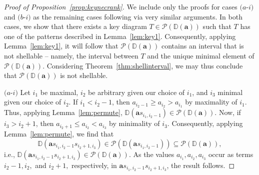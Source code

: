 \documentclass[letterpaper,10pt]{article}
\begin{document}
\begin{proof}[Proof of Proposition~\ref{prop:keynecrank}]
We include only the proofs for cases $(a$-$i)$ and $(b$-$i)$ as the remaining cases following via very similar arguments. In both cases, we show that there exists a key diagram $T\in \mathcal{P}(\mathbb{D}(\mathbf{a}))$ such that $T$ has one of the patterns described in Lemma~\ref{lem:key1}. Consequently, applying Lemma~\ref{lem:key1}, it will follow that $\mathcal{P}(\mathbb{D}(\mathbf{a}))$ contains an interval that is not shellable -- namely, the interval between $T$ and the unique minimal element of $\mathcal{P}(\mathbb{D}(\mathbf{a})).$ Considering Theorem~\ref{thm:shellinterval}, we may thus conclude that $\mathcal{P}(\mathbb{D}(\mathbf{a}))$ is not shellable.
\bigskip

\noindent
$(a$-$i)$ Let $i_1$ be maximal, $i_2$ be arbitrary given our choice of $i_1$, and $i_3$ minimal given our choice of $i_2$. If $i_1<i_2-1$, then $a_{i_2-1}\ge a_{i_2}>a_{i_1}$ by maximality of $i_1$. Thus, applying Lemma~\ref{lem:permute}, $\mathbb{D}(\mathbf{a}s_{i_1,i_2-1})\in \mathcal{P}(\mathbb{D}(\mathbf{a}))$. Now, if $i_3>i_2+1$, then $a_{i_2+1}\le a_{i_2}<a_{i_3}$ by minimality of $i_3$. Consequently, applying Lemma~\ref{lem:permute}, we find that $$\mathbb{D}(\mathbf{a}s_{i_1,i_2-1}s_{i_2+1,i_3})\in \mathcal{P}(\mathbb{D}(\mathbf{a}s_{i_1,i_2-1}))\subseteq \mathcal{P}(\mathbb{D}(\mathbf{a})),$$ i.e., $\mathbb{D}(\mathbf{a}s_{i_1,i_2-1}s_{i_2+1,i_3})\in \mathcal{P}(\mathbb{D}(\mathbf{a}))$. As the values $a_{i_1},a_{i_2},a_{i_3}$ occur as terms $i_2-1, i_2,$ and $i_2+1,$ respectively, in $\mathbf{a}s_{i_1,i_2-1}s_{i_2+1,i_3}$, the result follows.
\bigskip


\end{proof}
\end{document}

